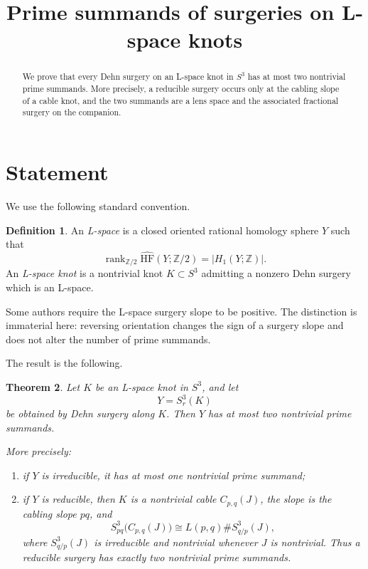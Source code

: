\documentclass[11pt]{article}
\title{Prime summands of surgeries on L-space knots}
\author{}
\date{}
\newtheorem{theorem}{Theorem}[section]
\theoremstyle{definition}
\newtheorem{definition}[theorem]{Definition}
\theoremstyle{remark}
\newcommand{\HF}{\widehat{\mathrm{HF}}}
\newcommand{\Z}{\mathbb{Z}}
\begin{document}
\maketitle

\begin{abstract}
We prove that every Dehn surgery on an L-space knot in \(S^3\) has at
most two nontrivial prime summands.  More precisely, a reducible
surgery occurs only at the cabling slope of a cable knot, and the two
summands are a lens space and the associated fractional surgery on the
companion.
\end{abstract}

\section{Statement}

We use the following standard convention.

\begin{definition}
An \emph{L-space} is a closed oriented rational homology sphere \(Y\)
such that
\[
\operatorname{rank}_{\Z/2}\HF(Y;\Z/2)
=
|H_1(Y;\Z)|.
\]
An \emph{L-space knot} is a nontrivial knot \(K\subset S^3\) admitting
a nonzero Dehn surgery which is an L-space.
\end{definition}

Some authors require the L-space surgery slope to be positive.  The
distinction is immaterial here: reversing orientation changes the sign
of a surgery slope and does not alter the number of prime summands.

The result is the following.

\begin{theorem}\label{thm:main}
Let \(K\) be an L-space knot in \(S^3\), and let
\[
Y=S^3_r(K)
\]
be obtained by Dehn surgery along \(K\).  Then \(Y\) has at most two
nontrivial prime summands.

More precisely:
\begin{enumerate}
\item if \(Y\) is irreducible, it has at most one nontrivial prime
      summand;
\item if \(Y\) is reducible, then \(K\) is a nontrivial cable
      \(C_{p,q}(J)\), the slope is the cabling slope \(pq\), and
      \[
      S^3_{pq}\bigl(C_{p,q}(J)\bigr)
      \cong
      L(p,q)\# S^3_{q/p}(J),
      \]
      where \(S^3_{q/p}(J)\) is irreducible and nontrivial whenever
      \(J\) is nontrivial.  Thus a reducible surgery has exactly two
      nontrivial prime summands.
\end{enumerate}
\end{theorem}
\end{document}
